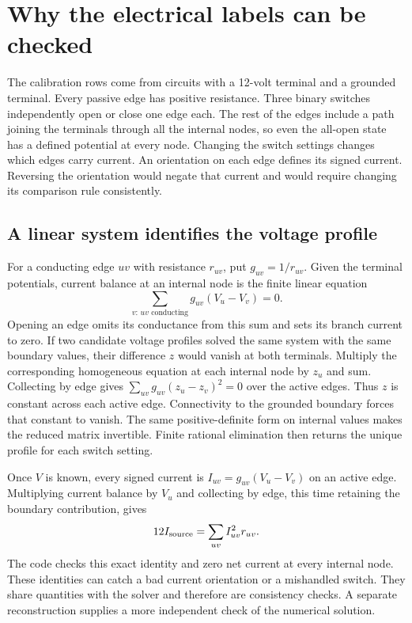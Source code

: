 \documentclass[12pt,letterpaper]{article}
\begin{document}
\section{Why the electrical labels can be checked}

The calibration rows come from circuits with a 12-volt terminal and a grounded terminal. Every passive edge has positive resistance. Three binary switches independently open or close one edge each. The rest of the edges include a path joining the terminals through all the internal nodes, so even the all-open state has a defined potential at every node. Changing the switch settings changes which edges carry current. An orientation on each edge defines its signed current. Reversing the orientation would negate that current and would require changing its comparison rule consistently.

\subsection{A linear system identifies the voltage profile}

For a conducting edge $uv$ with resistance $r_{uv}$, put $g_{uv}=1/r_{uv}$. Given the terminal potentials, current balance at an internal node is the finite linear equation
\[
 \sum_{v:\,uv\text{ conducting}}g_{uv}(V_u-V_v)=0 .
\]
Opening an edge omits its conductance from this sum and sets its branch current to zero. If two candidate voltage profiles solved the same system with the same boundary values, their difference $z$ would vanish at both terminals. Multiply the corresponding homogeneous equation at each internal node by $z_u$ and sum. Collecting by edge gives $\sum_{uv} g_{uv}(z_u-z_v)^2=0$ over the active edges. Thus $z$ is constant across each active edge. Connectivity to the grounded boundary forces that constant to vanish. The same positive-definite form on internal values makes the reduced matrix invertible. Finite rational elimination then returns the unique profile for each switch setting.

Once $V$ is known, every signed current is $I_{uv}=g_{uv}(V_u-V_v)$ on an active edge. Multiplying current balance by $V_u$ and collecting by edge, this time retaining the boundary contribution, gives
\[
 12 I_{\rm source}=\sum_{uv} I_{uv}^2 r_{uv}.
\]
The code checks this exact identity and zero net current at every internal node. These identities can catch a bad current orientation or a mishandled switch. They share quantities with the solver and therefore are consistency checks. A separate reconstruction supplies a more independent check of the numerical solution.
\end{document}
